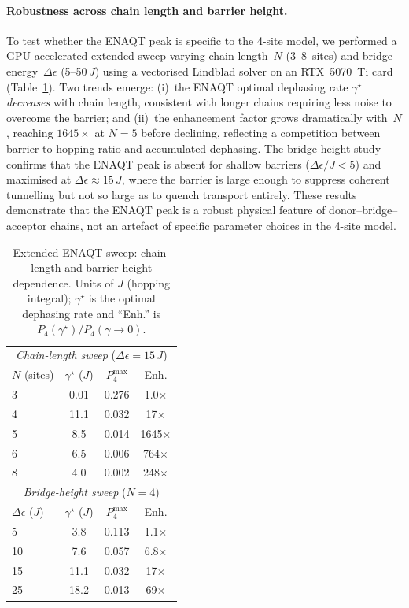 \documentclass[twocolumn,11pt]{article}
\newcommand{\Pfour}{P_{4}}
\begin{document}
\paragraph{Robustness across chain length and barrier height.}
To test whether the ENAQT peak is specific to the 4-site
model, we performed a GPU-accelerated extended sweep varying
chain length~$N$ (3--8~sites) and bridge energy~$\Delta\epsilon$
(5--50\,$J$) using a vectorised Lindblad solver on an
RTX~5070~Ti card (Table~\ref{tab:1c-ext}).
Two trends emerge: (i)~the ENAQT optimal dephasing rate
$\gamma^{\star}$ \emph{decreases} with chain length, consistent
with longer chains requiring less noise to overcome the barrier;
and (ii)~the enhancement factor grows dramatically with~$N$,
reaching $1645\times$ at $N = 5$ before declining, reflecting a
competition between barrier-to-hopping ratio and accumulated
dephasing.  The bridge height study confirms that the ENAQT peak
is absent for shallow barriers ($\Delta\epsilon / J < 5$) and
maximised at $\Delta\epsilon \approx 15\,J$, where the barrier is
large enough to suppress coherent tunnelling but not so large as
to quench transport entirely.
These results demonstrate that the ENAQT peak is a robust
physical feature of donor--bridge--acceptor chains, not an
artefact of specific parameter choices in the 4-site model.

\begin{table}[b]
\caption{\label{tab:1c-ext}Extended ENAQT sweep: chain-length
  and barrier-height dependence.  Units of $J$
  (hopping integral); $\gamma^{\star}$ is the optimal dephasing
  rate and ``Enh.'' is $\Pfour(\gamma^{\star}) /
  \Pfour(\gamma{\to}0)$.}
\centering
\begin{tabular}{lccc}
  \toprule
  \multicolumn{4}{c}{\textit{Chain-length sweep}
    ($\Delta\epsilon = 15\,J$)} \\
  $N$ (sites) & $\gamma^{\star}$ ($J$) & $\Pfour^{\max}$ & Enh. \\
  \midrule
  3 & 0.01  & 0.276 & 1.0$\times$ \\
  4 & 11.1  & 0.032 & 17$\times$  \\
  5 & 8.5   & 0.014 & 1645$\times$\\
  6 & 6.5   & 0.006 & 764$\times$ \\
  8 & 4.0   & 0.002 & 248$\times$ \\
  \midrule
  \multicolumn{4}{c}{\textit{Bridge-height sweep}
    ($N = 4$)} \\
  $\Delta\epsilon$ ($J$) & $\gamma^{\star}$ ($J$) &
    $\Pfour^{\max}$ & Enh. \\
  \midrule
  5   & 3.8  & 0.113 & 1.1$\times$ \\
  10  & 7.6  & 0.057 & 6.8$\times$ \\
  15  & 11.1 & 0.032 & 17$\times$  \\
  25  & 18.2 & 0.013 & 69$\times$  \\
  \bottomrule
\end{tabular}
\end{table}
\end{document}
